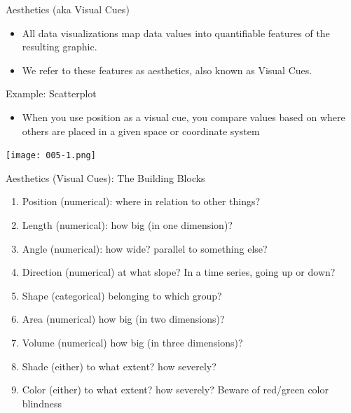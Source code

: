 \documentclass[10pt,handout]{beamer}\usepackage[]{graphicx}\usepackage[]{color}
\begin{document}
	
	\begin{frame}{Aesthetics (aka Visual Cues)}
	\begin{itemize}
		\item All data visualizations map data values into quantifiable features of the resulting graphic. 
		\item We refer to these features as aesthetics, also known as Visual Cues.
	\end{itemize}
		\end{frame}
	
	
	\begin{frame}{Example: Scatterplot}
		\begin{itemize}
			\item When you use position as a visual cue, you compare values based on where others are placed in a given space or coordinate system
		\end{itemize}
		
\texttt{[image: 005-1.png]}
	\end{frame}

\begin{frame}{Aesthetics (Visual Cues): The Building Blocks}
	\begin{enumerate}
		\item Position (numerical): where in relation to other things? 
		\item Length (numerical): how big (in one dimension)? 
		\item  Angle (numerical): how wide? parallel to something else? 
		\item  Direction (numerical) at what slope? In a time series, going up or down? 
		\item  Shape (categorical) belonging to which group? 
		\item  Area (numerical) how big (in two dimensions)? 
		\item  Volume (numerical) how big (in three dimensions)? 
		\item  Shade (either) to what extent? how severely? 
		\item  Color (either) to what extent? how severely? Beware of red/green color blindness
		
		
	\end{enumerate}
\end{frame}
\end{document}
